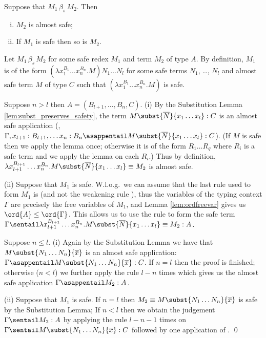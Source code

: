\begin{lemma}
\label{lem:betas_preserves_safety}
Suppose that $M_1\, \beta_s\, M_2$. Then
\begin{enumerate}[(i)]
  \item $M_2$ is almost safe;
  \item If $M_1$ is safe then so is $M_2$.
\end{enumerate}
\end{lemma}
\proof
Let $M_1\, \beta_s\, M_2$ for some safe redex $M_1$ and term $M_2$ of type $A$. By definition, $M_1$ is of the form $(\lambda x_1^{B_1} \ldots x_n^{B_n} . M) N_1 \ldots N_l $ for some safe terms $N_1$, \ldots, $N_l$ and almost safe term $M$ of type $C$ such that $(\lambda x_1^{B_1} \ldots x_n^{B_n} . M)$ is safe.
\begin{compactitem}[-]
\item
Suppose $n>l$ then $A = (B_{l+1}, \ldots, B_n, C)$.
(i) By the Substitution Lemma
\ref{lem:subst_preserves_safety}, the term $M\subst{\overline{N}}{x_1
\ldots x_l} : C$ is an almost safe application (\ie, $\Gamma, x_{l+1}:B_{l+1}, \ldots x_n :B_{n}\asappentail M\subst{\overline{N}}{x_1
\ldots x_l} : C$). (If $M$ is safe then we apply the lemma once; otherwise it is of the form $R_1 \ldots R_q$ where $R_i$ is a safe term and we apply the lemma on each $R_i$.)
Thus by definition, $\lambda x_{l+1}^{B_{l+1}} \ldots x_n^{B_n} . M\subst{\overline{N}}{x_1
\ldots x_l} \equiv M_2$ is almost safe.

(ii) Suppose that $M_1$ is safe. W.l.o.g.~we can assume that the last rule used to form  $M_1$ is  (and not the weakening rule
), thus the variables of the typing context $\Gamma$ are precisely the free variables of $M_1$, and Lemma \ref{lem:ordfreevar} gives us $\ord{A} \leq \ord{\Gamma}$. This allows us to use the rule  to form the safe term $\Gamma
\sentail \lambda x_{l+1}^{B_{l+1}} \ldots x_n^{B_n} . M\subst{\overline{N}}{x_1
\ldots x_l} \equiv M_2 : A$.

\item Suppose $n \leq l$. (i) Again by the Substitution Lemma
we have that $M\subst{N_1 \ldots N_n}{\overline{x}}$ is an almost safe application: $\Gamma \asappentail M\subst{N_1 \ldots N_n}{\overline{x}} : C$. If $n=l$ then the proof is finished; otherwise ($n<l$) we further apply the rule  $l-n$ times which gives us the almost safe application $\Gamma \asappentail M_2 :A$.

(ii) Suppose that $M_1$ is safe.  If $n=l$ then $M_2\equiv M\subst{N_1 \ldots N_n}{\overline{x}}$ is safe by the Substitution Lemma;
If $n<l$ then we obtain the judgement $\Gamma \sentail M_2 :A$ by
applying the rule  $l-n-1$ times on $\Gamma \sentail M\subst{N_1 \ldots N_n}{\overline{x}} : C$ followed by one application of .
\qed
\end{compactitem}
\smallskip

